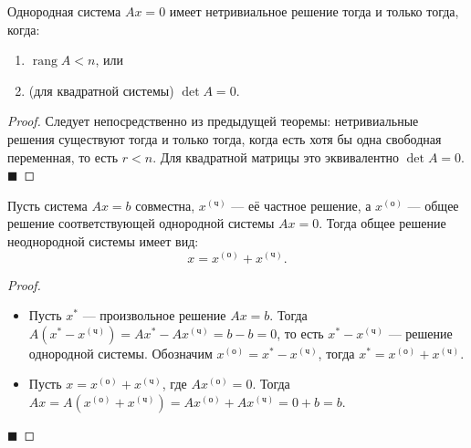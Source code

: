 \begin{theorem}
Однородная система $Ax = 0$ имеет нетривиальное решение тогда и только тогда, когда:
\begin{enumerate}
    \item $\operatorname{rang} A < n$, или
    \item (для квадратной системы) $\det A = 0$.
\end{enumerate}
\end{theorem}

\begin{proof}
Следует непосредственно из предыдущей теоремы: нетривиальные решения существуют тогда и только тогда, когда есть хотя бы одна свободная переменная, то есть $r < n$. Для квадратной матрицы это эквивалентно $\det A = 0$.
\hfill$\blacksquare$
\end{proof}

\begin{theorem}
Пусть система $Ax = b$ совместна, $x^{(\text{ч})}$ --- её частное решение, а $x^{(\text{о})}$ --- общее решение соответствующей однородной системы $Ax = 0$. Тогда общее решение неоднородной системы имеет вид:
\[
x = x^{(\text{о})} + x^{(\text{ч})}.
\]
\end{theorem}

\begin{proof}
\begin{itemize}
    \item[$\Rightarrow$] Пусть $x^*$ --- произвольное решение $Ax = b$. Тогда $A(x^* - x^{(\text{ч})}) = Ax^* - Ax^{(\text{ч})} = b - b = 0$, то есть $x^* - x^{(\text{ч})}$ --- решение однородной системы. Обозначим $x^{(\text{о})} = x^* - x^{(\text{ч})}$, тогда $x^* = x^{(\text{о})} + x^{(\text{ч})}$.
    
    \item[$\Leftarrow$] Пусть $x = x^{(\text{о})} + x^{(\text{ч})}$, где $Ax^{(\text{о})} = 0$. Тогда $Ax = A(x^{(\text{о})} + x^{(\text{ч})}) = Ax^{(\text{о})} + Ax^{(\text{ч})} = 0 + b = b$.
\end{itemize}
\hfill$\blacksquare$
\end{proof}
